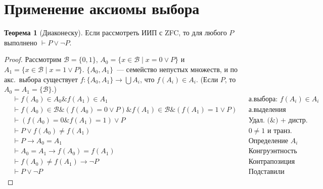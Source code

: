 \documentclass[a4paper,11pt]{article}
\theoremstyle{definition}
\newtheorem*{thm}{Теорема}
\newcommand{\proves}{\vdash}
\newcommand{\amp}{\mathbin{\&}}
\begin{document}
\section{Применение аксиомы выбора}
\begin{thm}[Диаконеску]
Если рассмотреть ИИП с ZFC, то для любого $P$ выполнено $\proves P \vee \neg P$.
\end{thm}
\begin{proof}
Рассмотрим $\mathcal{B} = \{0, 1\}$, $A_0 = \{x \in \mathcal{B} \mid x = 0 \vee
P\}$ и $A_1 = \{x \in \mathcal{B} \mid x = 1 \vee P\}$. $\{A_0, A_1\}$~---
семейство непустых множеств, и по акс.\ выбора существует $f : \{A_0, A_1\} \to
\bigcup A_i$, что $f(A_i) \in A_i$. (Если $P$, то $A_0 = A_1 = \{\mathcal{B}\}$.)
\begin{align*}
&\proves f(A_0) \in A_0 \amp f(A_1) \in A_1 &&\text{а.выбора: } f(A_i) \in A_i\\
&\proves f(A_0) \in \mathcal{B} \amp (f(A_0) = 0 \vee P) \amp f(A_1) \in \mathcal{B} \amp (f(A_1) = 1 \vee P) &&\text{а.выделения}\\
&\proves (f(A_0) = 0 \amp f(A_1) = 1) \vee P &&\text{Удал.\ ($\amp$) + дистр.}\\
&\proves P \vee f(A_0) \ne f(A_1) &&\text{$0 \ne 1$ и транз.}\\
&\proves P \to A_0 = A_1 &&\text{Определение } A_i\\
&\proves A_0 = A_1 \to f(A_0) = f(A_1) &&\text{Конгруэнтность}\\
&\proves f(A_0) \ne f(A_1) \to \neg P &&\text{Контрапозиция}\\
&\proves P \vee \neg P &&\text{Подставили}
\end{align*}
\end{proof}
\end{document}

